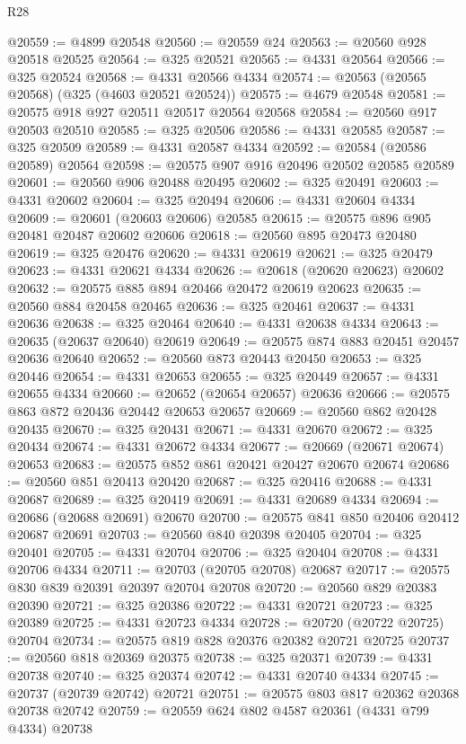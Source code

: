 \begin{lexlean}{R28}
\begin{coremodule}
@20559 := @4899 @20548
@20560 := @20559 @24
@20563 := @20560 @928 @20518 @20525
@20564 := @325 @20521
@20565 := @4331 @20564
@20566 := @325 @20524
@20568 := @4331 @20566 @4334
@20574 := @20563 (@20565 @20568) (@325 (@4603 @20521 @20524))
@20575 := @4679 @20548
@20581 := @20575 @918 @927 @20511 @20517 @20564 @20568
@20584 := @20560 @917 @20503 @20510
@20585 := @325 @20506
@20586 := @4331 @20585
@20587 := @325 @20509
@20589 := @4331 @20587 @4334
@20592 := @20584 (@20586 @20589) @20564
@20598 := @20575 @907 @916 @20496 @20502 @20585 @20589
@20601 := @20560 @906 @20488 @20495
@20602 := @325 @20491
@20603 := @4331 @20602
@20604 := @325 @20494
@20606 := @4331 @20604 @4334
@20609 := @20601 (@20603 @20606) @20585
@20615 := @20575 @896 @905 @20481 @20487 @20602 @20606
@20618 := @20560 @895 @20473 @20480
@20619 := @325 @20476
@20620 := @4331 @20619
@20621 := @325 @20479
@20623 := @4331 @20621 @4334
@20626 := @20618 (@20620 @20623) @20602
@20632 := @20575 @885 @894 @20466 @20472 @20619 @20623
@20635 := @20560 @884 @20458 @20465
@20636 := @325 @20461
@20637 := @4331 @20636
@20638 := @325 @20464
@20640 := @4331 @20638 @4334
@20643 := @20635 (@20637 @20640) @20619
@20649 := @20575 @874 @883 @20451 @20457 @20636 @20640
@20652 := @20560 @873 @20443 @20450
@20653 := @325 @20446
@20654 := @4331 @20653
@20655 := @325 @20449
@20657 := @4331 @20655 @4334
@20660 := @20652 (@20654 @20657) @20636
@20666 := @20575 @863 @872 @20436 @20442 @20653 @20657
@20669 := @20560 @862 @20428 @20435
@20670 := @325 @20431
@20671 := @4331 @20670
@20672 := @325 @20434
@20674 := @4331 @20672 @4334
@20677 := @20669 (@20671 @20674) @20653
@20683 := @20575 @852 @861 @20421 @20427 @20670 @20674
@20686 := @20560 @851 @20413 @20420
@20687 := @325 @20416
@20688 := @4331 @20687
@20689 := @325 @20419
@20691 := @4331 @20689 @4334
@20694 := @20686 (@20688 @20691) @20670
@20700 := @20575 @841 @850 @20406 @20412 @20687 @20691
@20703 := @20560 @840 @20398 @20405
@20704 := @325 @20401
@20705 := @4331 @20704
@20706 := @325 @20404
@20708 := @4331 @20706 @4334
@20711 := @20703 (@20705 @20708) @20687
@20717 := @20575 @830 @839 @20391 @20397 @20704 @20708
@20720 := @20560 @829 @20383 @20390
@20721 := @325 @20386
@20722 := @4331 @20721
@20723 := @325 @20389
@20725 := @4331 @20723 @4334
@20728 := @20720 (@20722 @20725) @20704
@20734 := @20575 @819 @828 @20376 @20382 @20721 @20725
@20737 := @20560 @818 @20369 @20375
@20738 := @325 @20371
@20739 := @4331 @20738
@20740 := @325 @20374
@20742 := @4331 @20740 @4334
@20745 := @20737 (@20739 @20742) @20721
@20751 := @20575 @803 @817 @20362 @20368 @20738 @20742
@20759 := @20559 @624 @802 @4587 @20361 (@4331 @799 @4334) @20738

\end{coremodule}
\end{lexlean}

